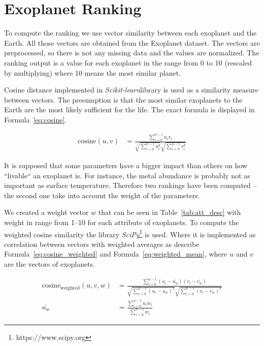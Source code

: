 \documentclass[12p]{article}
\begin{document}

\section{Exoplanet Ranking}
To compute the ranking we use vector similarity between each exoplanet and the Earth. All those vectors are obtained from the Exoplanet dataset. The vectors are preprocessed, so there is not any missing data and the values are normalized. The ranking output is a value for each exoplanet in the range from 0 to 10 (rescaled by multiplying) where 10 means the most similar planet.

Cosine distance implemented in \textit{Scikit-learn}\footnotemark[\value{footnote}] library is used as a similarity measure between vectors. The presumption is that the most similar exoplanets to the Earth are the most likely sufficient for the life. The exact formula is displayed in Formula~\ref{eq:cosine}.

\begin{align}
    \text{cosine}(u,v) &= \frac{\sum_{i=0}^{n-1} u_iv_i  }{ \sqrt{\sum_{i=0}^{n-1} u_i^2  } \sqrt{\sum_{i=0}^{n-1} v_i^2  }} \label{eq:cosine}
\end{align}

It is supposed that some parameters have a bigger impact than others on how ``livable`` an exoplanet is. For instance, the metal abundance is probably not as important as surface temperature. Therefore two rankings have been computed -- the second one take into account the weight of the parameters.

We created a weight vector $w$ that can be seen in Table~\ref{tab:att_desc} with weight in range from 1--10 for each attribute of exoplanets. To compute the weighted cosine similarity the library \textit{SciPy}\footnote{https://www.scipy.org} is used. Where it is implemented as correlation between vectors with weighted averages as describe Formula~\ref{eq:cosine_weighted} and Formula~\ref{eq:weighted_mean}, where $u$ and $v$ are the vectors of exoplanets.

\begin{align}
\text{cosine}_{\text{weighted}}(u,v,w) &= \frac{\sum_{i=0}^{n-1} (u_i-\overline{u_w})(v_i-\overline{v_w})  }{ \sqrt{\sum_{i=0}^{n-1} (u_i-\overline{u_w})^2  } \sqrt{\sum_{i=0}^{n-1} (v_i-\overline{v_w})^2  }} \label{eq:cosine_weighted} \\
\overline{u_w} &= \frac{ \sum_{i=0}^{n-1} u_iw_i }{ \sum_{i=0}^{n-1} w_i } \label{eq:weighted_mean}
\end{align}
\end{document}
